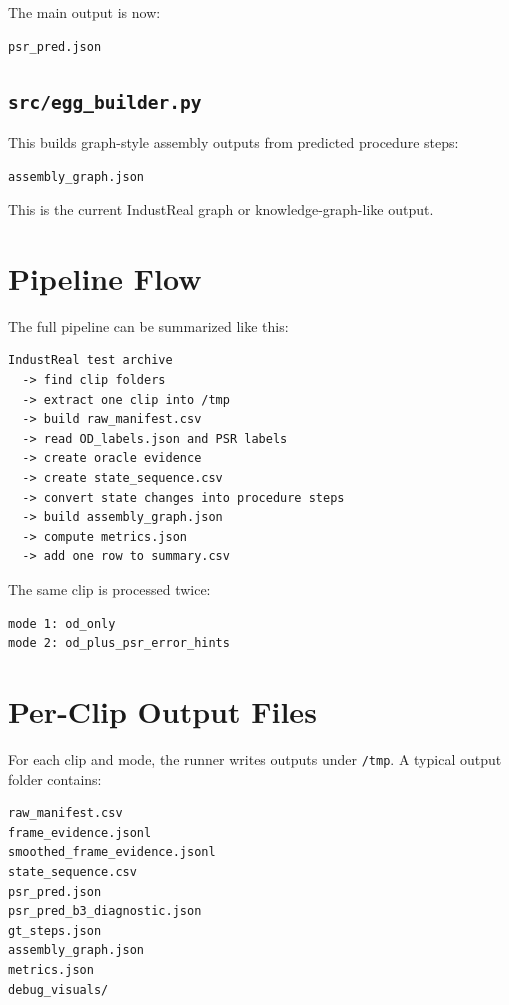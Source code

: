 \documentclass[11pt,a4paper]{article}
\begin{document}
The main output is now:

\begin{lstlisting}
psr_pred.json
\end{lstlisting}

\subsection{\texttt{src/egg\_builder.py}}

This builds graph-style assembly outputs from predicted procedure steps:

\begin{lstlisting}
assembly_graph.json
\end{lstlisting}

This is the current IndustReal graph or knowledge-graph-like output.

\section{Pipeline Flow}

The full pipeline can be summarized like this:

\begin{lstlisting}
IndustReal test archive
  -> find clip folders
  -> extract one clip into /tmp
  -> build raw_manifest.csv
  -> read OD_labels.json and PSR labels
  -> create oracle evidence
  -> create state_sequence.csv
  -> convert state changes into procedure steps
  -> build assembly_graph.json
  -> compute metrics.json
  -> add one row to summary.csv
\end{lstlisting}

The same clip is processed twice:

\begin{lstlisting}
mode 1: od_only
mode 2: od_plus_psr_error_hints
\end{lstlisting}

\section{Per-Clip Output Files}

For each clip and mode, the runner writes outputs under \texttt{/tmp}. A typical output folder contains:

\begin{lstlisting}
raw_manifest.csv
frame_evidence.jsonl
smoothed_frame_evidence.jsonl
state_sequence.csv
psr_pred.json
psr_pred_b3_diagnostic.json
gt_steps.json
assembly_graph.json
metrics.json
debug_visuals/
\end{lstlisting}
\end{document}
